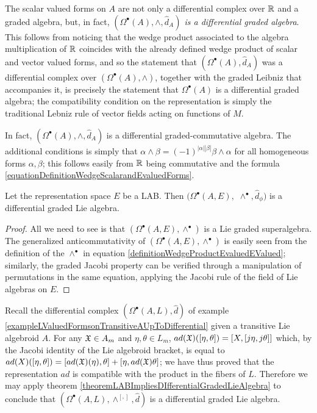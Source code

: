 \begin{example}
The scalar valued forms on $A$ are not only a differential complex over $\mathbb{R}$ and a graded algebra, but, in fact, \textit{$(\Omega^\bullet(A), \wedge, \hat d_A)$ is a differential graded algebra}. This follows from noticing that the wedge product associated to the algebra multiplication of $\mathbb{R}$ coincides with the already defined wedge product of scalar and vector valued forms, and so the statement that $(\Omega^\bullet(A), \hat d_A)$ was a differential complex over $(\Omega^\bullet(A), \wedge)$, together with the graded Leibniz that accompanies it, is precisely the statement that $\Omega^\bullet(A)$ is a differential graded algebra; the compatibility condition on the representation is simply the traditional Lebniz rule of vector fields acting on functions of $M$.

In fact, $(\Omega^\bullet(A), \wedge, \hat d_A)$ is a differential graded-commutative algebra. The additional conditions is simply that $\alpha \wedge \beta = (-1)^{|\alpha||\beta|}\beta \wedge \alpha$ for all homogeneous forms $\alpha, \beta$; this follows easily from $\mathbb{R}$ being commutative and the formula \eqref{equationDefinitionWedgeScalarandEvaluedForms}.
\end{example}

\begin{theorem}\label{theoremLABImpliesDIfferentialGradedLieAlgebra}
Let the representation space $E$ be a LAB. Then $(\Omega^\bullet(A, E),$ $\wedge^\bullet, \hat d_\phi)$ is a differential graded Lie algebra.
\end{theorem}
\begin{proof}
All we need to see is that $(\Omega^\bullet(A, E), \wedge^\bullet)$ is a Lie graded superalgebra. The generalized anticommutativity of $(\Omega^\bullet(A, E), \wedge^\bullet)$ is easily seen from the definition of the $\wedge^\bullet$ in equation \eqref{definitionWedgeProductEvaluedEValued}; similarly, the graded Jacobi property can be verified through a manipulation of permutations in the same equation, applying the Jacobi rule of the field of Lie algebras on $E$. 
\end{proof}

\begin{example}\label{exampleOmegaALIsDIfferentialGradedLieAlgebra}
Recall the differential complex $(\Omega^\bullet(A, L), \hat d)$ of example \ref{exampleLValuedFormsonTransitiveAUpToDifferential} given a transitive Lie algebroid $A$. For any $\mathfrak{X} \in A_m$ and $\eta, \theta \in L_m$, $ad(\mathfrak{X})([\eta, \theta]) = [X, [j\eta, j\theta]]$ which, by the Jacobi identity of the Lie algebroid bracket, is equal to $ad(X)([\eta, \theta]) = [ad(\mathfrak{X})(\eta), \theta] + [\eta, ad(\mathfrak{X}) \theta]$; we have thus proved that the representation $ad$ is compatible with the product in the fibers of $L$. Therefore we may apply theorem \ref{theoremLABImpliesDIfferentialGradedLieAlgebra} to conclude that $(\Omega^\bullet(A, L), \wedge^{[,]}, \hat d)$ is a differential graded Lie algebra.
\end{example}

